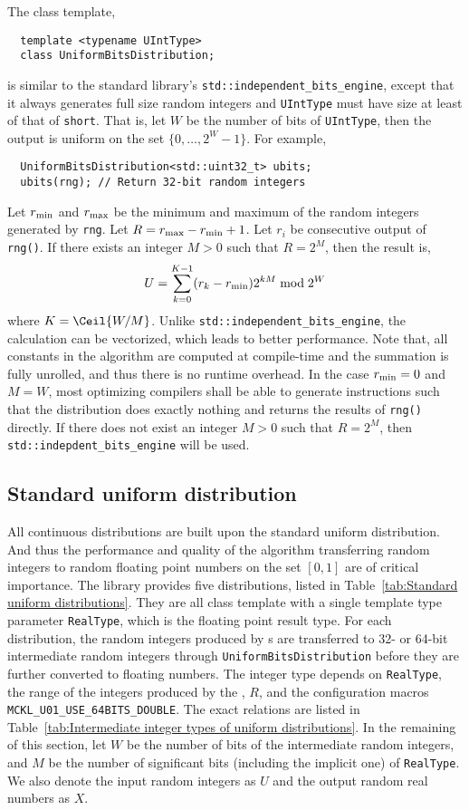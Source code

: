 The class template,
\begin{Verbatim}
  template <typename UIntType>
  class UniformBitsDistribution;
\end{Verbatim}
is similar to the standard library's \verb|std::independent_bits_engine|,
except that it always generates full size random integers and \verb|UIntType|
must have size at least of that of \verb|short|. That is, let $W$ be the number
of bits of \verb|UIntType|, then the output is uniform on the set
$\{0,\dots,2^W - 1\}$. For example,
\begin{Verbatim}
  UniformBitsDistribution<std::uint32_t> ubits;
  ubits(rng); // Return 32-bit random integers
\end{Verbatim}
Let $r_{\mathrm{min}}$ and $r_{\mathrm{max}}$ be the minimum and maximum of the random integers
generated by \verb|rng|. Let $R = r_{\mathrm{max}} - r_{\mathrm{min}} + 1$. Let $r_i$ be consecutive
output of \verb|rng()|. If there exists an integer $M > 0$ such that $R = 2^M$,
then the result is,
\begin{equation*}
  U = \sum_{k = 0}^{K - 1} (r_k - r_{\mathrm{min}}) 2^{kM} \bmod 2^W
\end{equation*}
where $K = \Ceil{W / M}$. Unlike \verb|std::independent_bits_engine|, the
calculation can be vectorized, which leads to better performance. Note that,
all constants in the algorithm are computed at compile-time and the summation
is fully unrolled, and thus there is no runtime overhead. In the case $r_{\mathrm{min}} =
0$ and $M = W$, most optimizing compilers shall be able to generate
instructions such that the distribution does exactly nothing and returns the
results of \verb|rng()| directly. If there does not exist an integer $M > 0$
such that $R = 2^M$, then \verb|std::indepdent_bits_engine| will be used.

\subsection{Standard uniform distribution}
\label{sub:Standard uniform distribution}

All continuous distributions are built upon the standard uniform distribution.
And thus the performance and quality of the algorithm transferring random
integers to random floating point numbers on the set $[0, 1]$ are of critical
importance. The library provides five distributions, listed in
Table~\ref{tab:Standard uniform distributions}. They are all class template
with a single template type parameter \verb|RealType|, which is the floating
point result type. For each distribution, the random integers produced by
\rng{}s are transferred to 32- or 64-bit intermediate random integers through
\verb|UniformBitsDistribution| before they are further converted to floating
numbers. The integer type depends on \verb|RealType|, the range of the integers
produced by the \rng{}, $R$, and the configuration macros
\verb|MCKL_U01_USE_64BITS_DOUBLE|. The exact relations are listed in
Table~\ref{tab:Intermediate integer types of uniform distributions}. In the
remaining of this section, let $W$ be the number of bits of the intermediate
random integers, and $M$ be the number of significant bits (including the
implicit one) of \verb|RealType|. We also denote the input random integers as
$U$ and the output random real numbers as $X$.

